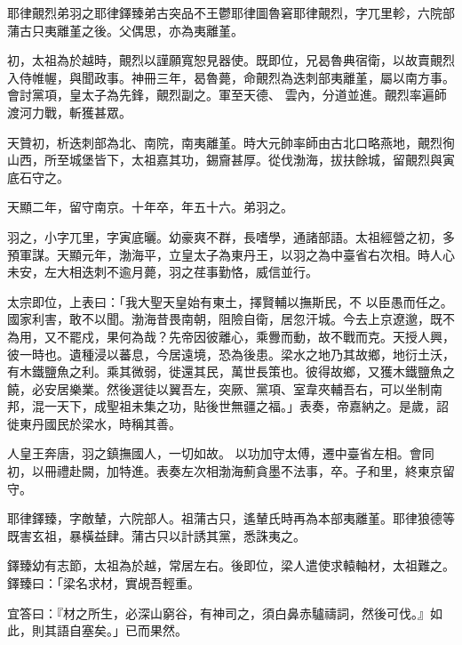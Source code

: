 
\begin{pinyinscope}

 耶律覿烈弟羽之耶律鐸臻弟古突品不王鬱耶律圖魯窘耶律覿烈，字兀里軫，六院部蒲古只夷離堇之後。父偶思，亦為夷離堇。



 初，太祖為於越時，覿烈以謹願寬恕見器使。既即位，兄曷魯典宿衛，以故賣覿烈入侍帷幄，與聞政事。神冊三年，曷魯薨，命覿烈為迭刺部夷離堇，屬以南方事。會討黨項，皇太子為先鋒，覿烈副之。軍至天德、
 雲內，分道並進。覿烈率遍師渡河力戰，斬獲甚眾。



 天贊初，析迭刺部為北、南院，南夷離堇。時大元帥率師由古北口略燕地，覿烈徇山西，所至城堡皆下，太祖嘉其功，錫齎甚厚。從伐渤海，拔扶餘城，留覿烈與寅底石守之。



 天顯二年，留守南京。十年卒，年五十六。弟羽之。



 羽之，小字兀里，字寅底曬。幼豪爽不群，長嗜學，通諸部語。太祖經營之初，多預軍謀。天顯元年，渤海平，立皇太子為東丹王，以羽之為中臺省右次相。時人心未安，左大相迭刺不逾月薨，羽之荏事勤恪，威信並行。



 太宗即位，上表曰：「我大聖天皇始有東土，擇賢輔以撫斯民，不
 以臣愚而任之。國家利害，敢不以聞。渤海昔畏南朝，阻險自衛，居忽汗城。今去上京遼邈，既不為用，又不罷戍，果何為哉？先帝因彼離心，乘釁而動，故不戰而克。天授人興，彼一時也。遺種浸以蕃息，今居遠境，恐為後患。梁水之地乃其故鄉，地衍土沃，有木鐵鹽魚之利。乘其微弱，徙還其民，萬世長策也。彼得故鄉，又獲木鐵鹽魚之饒，必安居樂業。然後選徒以翼吾左，突厥、黨項、室韋夾輔吾右，可以坐制南邦，混一天下，成聖祖未集之功，貼後世無疆之福。」表奏，帝嘉納之。是歲，詔徙東丹國民於梁水，時稱其善。



 人皇王奔唐，羽之鎮撫國人，一切如故。
 以功加守太傅，遷中臺省左相。會同初，以冊禮赴闕，加特進。表奏左次相渤海薊貪墨不法事，卒。子和里，終東京留守。



 耶律鐸臻，字敵輦，六院部人。祖蒲古只，遙輦氏時再為本部夷離堇。耶律狼德等既害玄祖，暴橫益肆。蒲古只以計誘其黨，悉誅夷之。



 鐸臻幼有志節，太祖為於越，常居左右。後即位，梁人遣使求轅軸材，太祖難之。鐸臻曰：「梁名求材，實覘吾輕重。



 宜答曰：『材之所生，必深山窮谷，有神司之，須白鼻赤驢禱詞，然後可伐。』如此，則其語自塞矣。」已而果然。




\end{pinyinscope}
